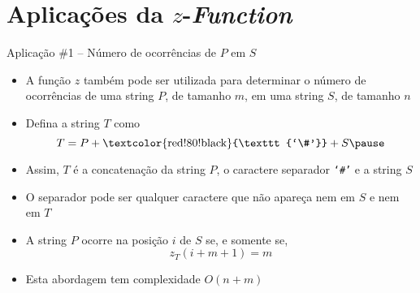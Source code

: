 \section{Aplicações da $z$-{\it Function}}

\begin{frame}[fragile]{Aplicação \#1 -- Número de ocorrências de $P$ em $S$}

    \begin{itemize}
        \item A função $z$ também pode ser utilizada para determinar o número de ocorrências de 
            uma string $P$, de tamanho $m$, em uma string $S$, de tamanho $n$
        \pause

        \item Defina a string $T$ como
        \[
            T = P + \mbox{\textcolor{red!80!black}{\texttt{`\#'}}} + S
        \pause
        \]

        \item Assim, $T$ é a concatenação da string $P$, o caractere separador
        \textcolor{red!80!black}{\texttt{`\#'}} e a string $S$
        \pause

        \item O separador pode ser qualquer caractere que não apareça nem em $S$ e nem em $T$ 
        \pause

        \item A string $P$ ocorre na posição $i$ de $S$ se, e somente se, 
        \[
            z_T(i + m + 1) = m
        \]
        \pause

        \item Esta abordagem tem complexidade $O(n + m)$

    \end{itemize}

\end{frame}

